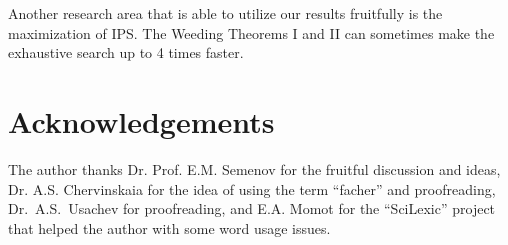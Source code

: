\documentclass[a4paper,14pt]{article} %
\theoremstyle{plain}
\theoremstyle{definition}
\begin{document}
	Another research area that is able to utilize our results fruitfully is the maximization of IPS.
	The Weeding Theorems I and II can sometimes make the exhaustive search up to 4 times faster.




\section{Acknowledgements}
The author thanks Dr. Prof. E.M. Semenov for the fruitful discussion and ideas,
Dr. A.S. Chervinskaia for the idea of using the term ``facher'' and proofreading,
Dr.~A.S.~Usachev for proofreading,
and E.A. Momot for the ``SciLexic'' project that helped the author with some word usage issues.


\printbibliography
\end{document}
